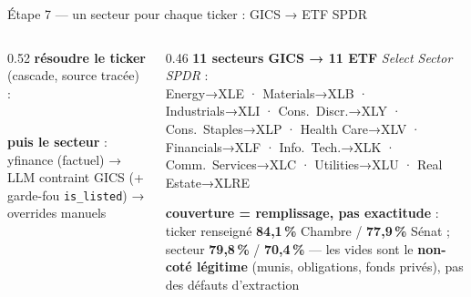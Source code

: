 \documentclass[11pt,aspectratio=169]{beamer}
\newcommand{\co}[1]{\texttt{#1}}
\begin{document}
\begin{frame}{Étape 7 — un secteur pour chaque ticker : GICS → ETF SPDR}
  \begin{columns}[T]
    \begin{column}{0.52\textwidth}\footnotesize
      \textbf{résoudre le ticker} (cascade, source tracée) :\\[1mm]
      \\[2mm]
      \textbf{puis le secteur} : yfinance (factuel) → LLM contraint GICS
      (+ garde-fou \co{is\_listed}) → overrides manuels
    \end{column}
    \begin{column}{0.46\textwidth}\footnotesize
      \textbf{11 secteurs GICS → 11 ETF} \emph{Select Sector SPDR} :\\[1.5mm]
      {\scriptsize\ttfamily
      Energy→XLE · Materials→XLB · Industrials→XLI · Cons.\ Discr.→XLY ·
      Cons.\ Staples→XLP · Health Care→XLV · Financials→XLF · Info.\ Tech.→XLK ·
      Comm.\ Services→XLC · Utilities→XLU · Real Estate→XLRE}\\[3mm]
      \colorbox{black!6}{\parbox{0.96\linewidth}{\scriptsize
        \textbf{couverture = remplissage, pas exactitude} : ticker renseigné
        \textbf{84,1\,\%} Chambre / \textbf{77,9\,\%} Sénat ; secteur
        \textbf{79,8\,\%} / \textbf{70,4\,\%} — les vides sont le
        \textbf{non-coté légitime} (munis, obligations, fonds privés),
        pas des défauts d'extraction}}
    \end{column}
  \end{columns}
\end{frame}
\end{document}
